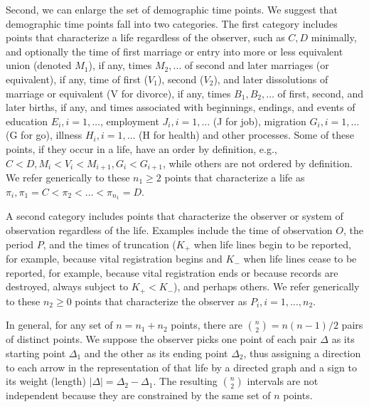\documentclass{bmcart}
\begin{document}
Second, we can enlarge the set of demographic time points.
We suggest that demographic time  points fall into two categories.
The first category includes points that characterize a life regardless of the observer, 
such as $C, D$ minimally, and optionally 
the time of first marriage or entry into more or less equivalent union (denoted $M_1$), if any, 
times $M_2,\ldots$ of second and later marriages (or equivalent), if any, 
time of first ($V_1$), second ($V_2$), and later dissolutions of marriage or equivalent (V for divorce), if any, 
times $B_1, B_2, \ldots$ of first, second, and later births, if any, 
and times associated with beginnings, endings, and events of 
education $E_i, i=1,\ldots$, employment $J_i, i=1,\ldots$ (J for job), migration $G_i, i=1,\ldots$ (G for go), illness $H_i, i=1,\ldots$ (H for health) and other processes.
Some of these points, if they occur in a life,
have an order by definition, e.g., $C<D, M_i<V_i<M_{i+1}, G_i<G_{i+1}$,
while others are not ordered by definition.  
We refer generically to these $ n_1 \geq 2$ points that characterize a life
as $\pi_i, \pi_1=C<\pi_2 < \ldots < \pi_{n_1}=D$.

A second category includes points that characterize the observer or system of observation 
regardless of the life.
Examples include
the time of observation $O$,
the period $P$, and the 
times of truncation ($K_+$ when life lines begin to be reported, for example, because vital registration 
begins
and $K_{-}$  when life lines cease to be reported, for example, because vital registration ends
or because records are destroyed, 
always subject to $K_+<K_{-}$),
and perhaps others. 
We refer generically to these $n_2 \geq 0$ points that characterize the observer
as $P_i, i=1, \ldots, n_2$.



In general, for any set of $n=n_1+n_2$ points, there are ${n \choose 2}=n(n-1)/2$ pairs of distinct points.
We suppose the observer picks one point of each pair $\Delta$
as its starting point $\Delta_1$ and the other as its ending point $\Delta_2$,
thus assigning a direction to each arrow in the representation of that life by a directed graph and
a sign to its weight (length) $|\Delta|=\Delta_2-\Delta_1$.
The resulting ${n \choose 2}$ intervals are not independent 
because they are constrained by the same set of $n$ points.
\end{document}
